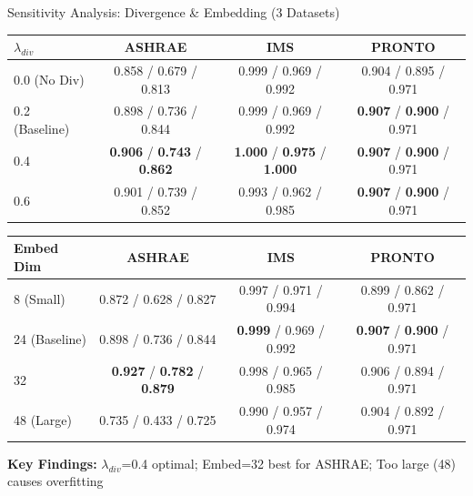 \documentclass[aspectratio=169,11pt]{beamer}
\begin{document}
\begin{frame}{Sensitivity Analysis: Divergence \& Embedding (3 Datasets)}
    \begin{table}[h]
        \centering
        \scriptsize
        \begin{tabular}{l|ccc}
            \toprule
            \textbf{$\lambda_{div}$} & \textbf{ASHRAE} & \textbf{IMS} & \textbf{PRONTO} \\
            \midrule
            0.0 (No Div) & 0.858 / 0.679 / 0.813 & 0.999 / 0.969 / 0.992 & 0.904 / 0.895 / 0.971 \\
            0.2 (Baseline) & 0.898 / 0.736 / 0.844 & 0.999 / 0.969 / 0.992 & \textbf{0.907} / \textbf{0.900} / 0.971 \\
            0.4 & \textbf{0.906} / \textbf{0.743} / \textbf{0.862} & \textbf{1.000} / \textbf{0.975} / \textbf{1.000} & \textbf{0.907} / \textbf{0.900} / 0.971 \\
            0.6 & 0.901 / 0.739 / 0.852 & 0.993 / 0.962 / 0.985 & \textbf{0.907} / \textbf{0.900} / 0.971 \\
            \bottomrule
        \end{tabular}
    \end{table}

    \begin{table}[h]
        \centering
        \scriptsize
        \begin{tabular}{l|ccc}
            \toprule
            \textbf{Embed Dim} & \textbf{ASHRAE} & \textbf{IMS} & \textbf{PRONTO} \\
            \midrule
            8 (Small) & 0.872 / 0.628 / 0.827 & 0.997 / 0.971 / 0.994 & 0.899 / 0.862 / 0.971 \\
            24 (Baseline) & 0.898 / 0.736 / 0.844 & \textbf{0.999} / 0.969 / 0.992 & \textbf{0.907} / \textbf{0.900} / 0.971 \\
            32 & \textbf{0.927} / \textbf{0.782} / \textbf{0.879} & 0.998 / 0.965 / 0.985 & 0.906 / 0.894 / 0.971 \\
            48 (Large) & 0.735 / 0.433 / 0.725 & 0.990 / 0.957 / 0.974 & 0.904 / 0.892 / 0.971 \\
            \bottomrule
        \end{tabular}
    \end{table}

    \textbf{Key Findings:} $\lambda_{div}$=0.4 optimal; Embed=32 best for ASHRAE; Too large (48) causes overfitting
\end{frame}
\end{document}
